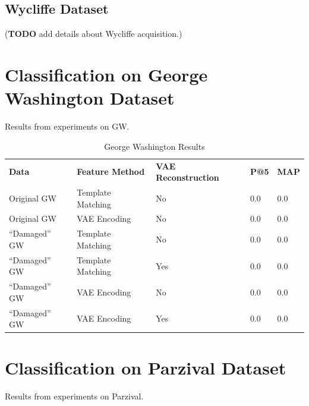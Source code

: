 \documentclass[final]{ukthesis}
\begin{document}
\subsection{Wycliffe Dataset}
(\textbf{TODO} add details about Wycliffe acquisition.)

%
%
\section{Classification on George Washington Dataset}
Results from experiments on GW.
\begin{table}[]
\centering
\caption{George Washington Results}
\label{my-label}
\begin{tabular}{lllll}
\textbf{Data}  & \textbf{Feature Method} & \textbf{VAE Reconstruction} & \textbf{P@5} & \textbf{MAP} \\
Original GW    & Template Matching       & No                          & 0.0          & 0.0          \\
Original GW    & VAE Encoding            & No                          & 0.0          & 0.0          \\
``Damaged'' GW & Template Matching       & No                          & 0.0          & 0.0          \\
``Damaged'' GW & Template Matching       & Yes                         & 0.0          & 0.0          \\
``Damaged'' GW & VAE Encoding            & No                          & 0.0          & 0.0          \\
``Damaged'' GW & VAE Encoding            & Yes                         & 0.0          & 0.0         
\end{tabular}
\end{table}




%
%
\section{Classification on Parzival Dataset}
Results from experiments on Parzival.
\end{document}
